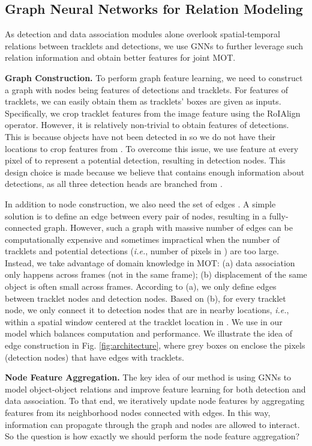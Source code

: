 \documentclass[letterpaper, 10 pt, conference]{ieeeconf}
\begin{document}
\subsection{Graph Neural Networks for Relation Modeling \label{sec:gnn}}
As detection and data association modules alone overlook spatial-temporal relations between tracklets and detections, we use GNNs to further leverage such relation information and obtain better features for joint MOT.

\vspace{1mm}\noindent\textbf{Graph Construction.} To perform graph feature learning, we need to construct a graph  with nodes  being features of detections and tracklets. For features of tracklets, we can easily obtain them as tracklets' boxes are given as inputs. Specifically, we crop tracklet features from the image feature  using the RoIAlign \cite{He2017} operator. However, it is relatively non-trivial to obtain features of detections. This is because objects have not been detected in  so we do not have their locations to crop features from . To overcome this issue, we use feature at every pixel of  to represent a potential detection, resulting in  detection nodes. This design choice is made because we believe that  contains enough information about detections, as all three detection heads are branched from . 

In addition to node construction, we also need the set of edges . A simple solution is to define an edge between every pair of nodes, resulting in a fully-connected graph. However, such a graph with massive number of edges can be computationally expensive and sometimes impractical when the number of tracklets and potential detections (\emph{i.e.}, number of pixels in ) are too large. Instead, we take advantage of domain knowledge in MOT: (a) data association only happens across frames (not in the same frame); (b) displacement of the same object is often small across frames. According to (a), we only define edges between tracklet nodes and detection nodes. Based on (b), for every tracklet node, we only connect it to detection nodes that are in nearby locations, \emph{i.e.}, within a  spatial window centered at the tracklet location in . We use  in our model which balances computation and performance. We illustrate the idea of edge construction in Fig. \ref{fig:architecture}, where grey boxes on  enclose the pixels (detection nodes) that have edges with tracklets.

\vspace{1mm}\noindent\textbf{Node Feature Aggregation.} The key idea of our method is using GNNs to model object-object relations and improve feature learning for both detection and data association. To that end, we iteratively update node features by aggregating features from its neighborhood nodes connected with edges. In this way, information can propagate through the graph and nodes are allowed to interact. So the question is how exactly we should perform the node feature aggregation? 
\end{document}

